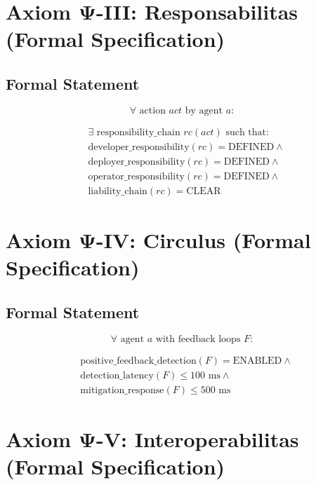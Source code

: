 \documentclass[12pt,a4paper,twoside,openright]{book}
\begin{document}
\section{Axiom Ψ-III: Responsabilitas (Formal Specification)}

\subsection{Formal Statement}

\begin{equation}
\forall \text{ action } act \text{ by agent } a:
\end{equation}

\begin{align}
&\exists \text{ responsibility\_chain } rc(act) \text{ such that:} \\
&\text{developer\_responsibility}(rc) = \text{DEFINED} \land \\
&\text{deployer\_responsibility}(rc) = \text{DEFINED} \land \\
&\text{operator\_responsibility}(rc) = \text{DEFINED} \land \\
&\text{liability\_chain}(rc) = \text{CLEAR}
\end{align}

\section{Axiom Ψ-IV: Circulus (Formal Specification)}

\subsection{Formal Statement}

\begin{equation}
\forall \text{ agent } a \text{ with feedback loops } F:
\end{equation}

\begin{align}
&\text{positive\_feedback\_detection}(F) = \text{ENABLED} \land \\
&\text{detection\_latency}(F) \leq 100\text{ ms} \land \\
&\text{mitigation\_response}(F) \leq 500\text{ ms}
\end{align}

\section{Axiom Ψ-V: Interoperabilitas (Formal Specification)}
\end{document}
